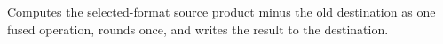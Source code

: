 Computes the selected-format source product minus the old destination as one fused operation, rounds once, and writes the result to the destination.
